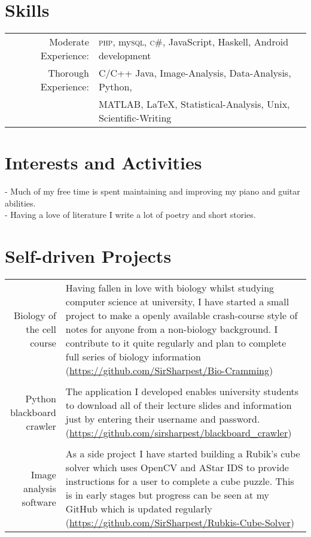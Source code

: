 \documentclass[a4paper,9pt]{article}
\begin{document}
\section{Skills}
\begin{tabular}{rl}
  Moderate Experience:& \textsc{php}, my\textsc{sql}, \textsc{c\#}, JavaScript, Haskell, Android development\\
  Thorough Experience:& C/C++ Java, Image-Analysis, Data-Analysis, Python, \\ &MATLAB, \LaTeX, Statistical-Analysis, Unix, Scientific-Writing
\end{tabular}

\section{Interests and Activities}                                                                               
- Much of my free time is spent maintaining and improving my piano and guitar abilities.\\                                     
- Having a love of literature I write a lot of poetry and short stories.

\section{Self-driven Projects}

\begin{tabular}{r|p{11cm}}

  Biology of the cell course & Having fallen in love with biology whilst studying computer science at university, I have started a small project to make a openly available crash-course style of notes for anyone from a non-biology background. I contribute to it quite regularly and plan to complete full series of biology information (\href{https://github.com/SirSharpest/Bio-Cramming}{https://github.com/SirSharpest/Bio-Cramming})\\
  \\
  Python blackboard crawler&  The application I developed enables university students to download all of their lecture slides and information just by entering their username and password.(\href{https://github.com/sirsharpest/blackboard\_crawler}{https://github.com/sirsharpest/blackboard\_crawler})\\
  \\
  Image analysis software& As a side project I have started building a Rubik's cube solver which uses OpenCV and AStar IDS to provide instructions for a user to complete a cube puzzle. This is in early stages but progress can be seen at my GitHub which is updated regularly (\href{https://github.com/SirSharpest/Rubkis-Cube-Solver}{https://github.com/SirSharpest/Rubkis-Cube-Solver})
\end{tabular}
\par 
\clearpage
\end{document}
